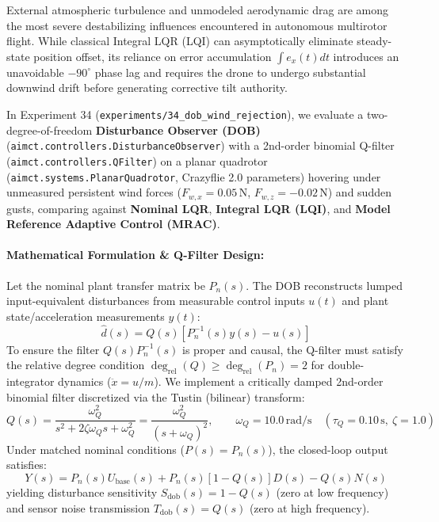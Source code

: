 \documentclass[11pt,a4paper]{article}
\begin{document}
External atmospheric turbulence and unmodeled aerodynamic drag are among the most severe destabilizing influences encountered in autonomous multirotor flight. While classical Integral LQR (LQI) can asymptotically eliminate steady-state position offset, its reliance on error accumulation $\int e_x(t) dt$ introduces an unavoidable $-90^\circ$ phase lag and requires the drone to undergo substantial downwind drift before generating corrective tilt authority.

In Experiment 34 (\texttt{experiments/34\_dob\_wind\_rejection}), we evaluate a two-degree-of-freedom \textbf{Disturbance Observer (DOB)} (\texttt{aimct.controllers.DisturbanceObserver}) with a 2nd-order binomial Q-filter (\texttt{aimct.controllers.QFilter}) on a planar quadrotor (\texttt{aimct.systems.PlanarQuadrotor}, Crazyflie 2.0 parameters) hovering under unmeasured persistent wind forces ($F_{w,x} = 0.05\,\text{N}$, $F_{w,z} = -0.02\,\text{N}$) and sudden gusts, comparing against \textbf{Nominal LQR}, \textbf{Integral LQR (LQI)}, and \textbf{Model Reference Adaptive Control (MRAC)}.

\paragraph{Mathematical Formulation \& Q-Filter Design:}
Let the nominal plant transfer matrix be $P_n(s)$. The DOB reconstructs lumped input-equivalent disturbances from measurable control inputs $u(t)$ and plant state/acceleration measurements $y(t)$:
\begin{equation}
\hat{d}(s) = Q(s)\left[ P_n^{-1}(s) y(s) - u(s) \right]
\end{equation}
To ensure the filter $Q(s) P_n^{-1}(s)$ is proper and causal, the Q-filter must satisfy the relative degree condition $\operatorname{deg}_{\text{rel}}(Q) \ge \operatorname{deg}_{\text{rel}}(P_n) = 2$ for double-integrator dynamics ($\ddot{x} = u/m$). We implement a critically damped 2nd-order binomial filter discretized via the Tustin (bilinear) transform:
\begin{equation}
Q(s) = \frac{\omega_Q^2}{s^2 + 2\zeta\omega_Q s + \omega_Q^2} = \frac{\omega_Q^2}{(s + \omega_Q)^2}, \qquad \omega_Q = 10.0\,\text{rad/s} \quad (\tau_Q = 0.10\,\text{s}, \ \zeta = 1.0)
\end{equation}
Under matched nominal conditions ($P(s) = P_n(s)$), the closed-loop output satisfies:
\begin{equation}
Y(s) = P_n(s) U_{\text{base}}(s) + P_n(s)\left[1 - Q(s)\right] D(s) - Q(s) N(s)
\end{equation}
yielding disturbance sensitivity $S_{\text{dob}}(s) = 1 - Q(s)$ (zero at low frequency) and sensor noise transmission $T_{\text{dob}}(s) = Q(s)$ (zero at high frequency).
\end{document}
